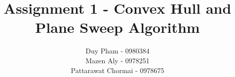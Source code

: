 \documentclass{article}
\begin{document}
\title{Assignment 1 - Convex Hull and Plane Sweep Algorithm}
\author{
	Duy Pham - 0980384 \\
	Mazen Aly - 0978251 \\
	Pattarawat Chormai - 0978675 \\
}
\maketitle



\end{document}
